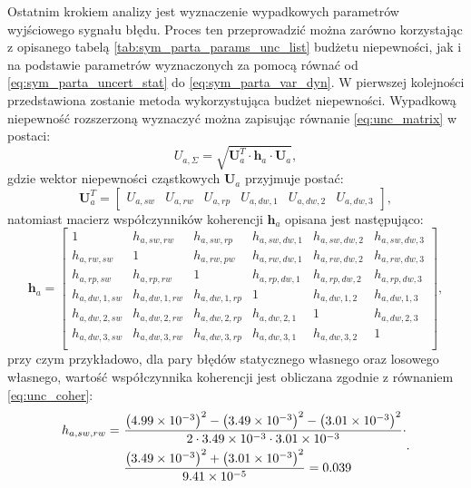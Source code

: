 Ostatnim krokiem analizy jest wyznaczenie wypadkowych parametrów wyjściowego sygnału błędu. Proces ten przeprowadzić można zarówno korzystając z opisanego tabelą \ref{tab:sym_parta_params_unc_list} budżetu niepewności, jak i na podstawie parametrów wyznaczonych za pomocą równać od \eqref{eq:sym_parta_uncert_stat} do \eqref{eq:sym_parta_var_dyn}. W pierwszej kolejności przedstawiona zostanie metoda wykorzystująca budżet niepewności. Wypadkową niepewność rozszerzoną wyznaczyć można zapisując równanie \eqref{eq:unc_matrix} w postaci:
\begin{equation}
U_{a,\Sigma} = \sqrt{\mathbf{U}_{a}^{T} \cdot \mathbf{h}_{a} \cdot \mathbf{U}_{a}} \label{eq:sym_parta_uncert_sum},
\end{equation}
gdzie wektor niepewności cząstkowych $\mathbf{U}_{a}$ przyjmuje postać:
\begin{equation}
\mathbf{U}_{a}^{T} =
\begin{bmatrix}
U_{a,sw} & U_{a,rw} & U_{a,rp} & U_{a,dw,1} & U_{a,dw,2} & U_{a,dw,3}
\end{bmatrix}
\label{eq:sym_parta_uncert_vector},
\end{equation}
natomiast macierz współczynników koherencji $\mathbf{h}_{a}$ opisana jest następująco:
\begin{equation}
\mathbf{h}_{a} =
\begin{bmatrix}
1             & h_{a,sw,rw}   & h_{a,sw,rp}   & h_{a,sw,dw,1} & h_{a,sw,dw,2} & h_{a,sw,dw,3} \\
h_{a,rw,sw}   & 1             & h_{a,rw,pw}   & h_{a,rw,dw,1} & h_{a,rw,dw,2} & h_{a,rw,dw,3} \\
h_{a,rp,sw}   & h_{a,rp,rw}   & 1             & h_{a,rp,dw,1} & h_{a,rp,dw,2} & h_{a,rp,dw,3} \\
h_{a,dw,1,sw} & h_{a,dw,1,rw} & h_{a,dw,1,rp} & 1             & h_{a,dw,1,2}  & h_{a,dw,1,3}  \\
h_{a,dw,2,sw} & h_{a,dw,2,rw} & h_{a,dw,2,rp} & h_{a,dw,2,1}  & 1             & h_{a,dw,2,3}  \\
h_{a,dw,3,sw} & h_{a,dw,3,rw} & h_{a,dw,3,rp} & h_{a,dw,3,1}  & h_{a,dw,3,2}  & 1             \\
\end{bmatrix}
\label{eq:sym_parta_uncert_coher},
\end{equation}
przy czym przykładowo, dla pary błędów statycznego własnego oraz losowego własnego, wartość współczynnika koherencji jest obliczana zgodnie z równaniem \eqref{eq:unc_coher}:
\begin{equation}
\begin{split}
h_{a,sw,rw} = ~
& \frac{\left(\num{4.99e-3}\right)^{2} - \left(\num{3.49e-3}\right)^{2} - \left(\num{3.01e-3}\right)^{2}}{2 \cdot \num{3.49e-3} \cdot \num{3.01e-3}} \cdot \\
& \frac{\left(\num{3.49e-3}\right)^{2} + \left(\num{3.01e-3}\right)^{2}}{\num{9.41e-5}} = 0.039
\end{split}
\label{eq:sym_parta_coher_sw_rw}.
\end{equation}
